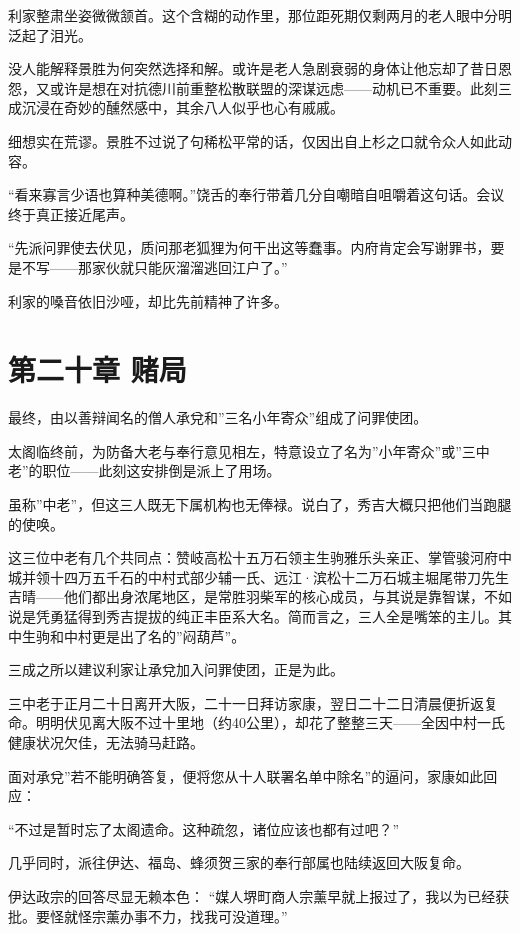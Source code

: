 \documentclass[
]{book}
\begin{document}
利家整肃坐姿微微颔首。这个含糊的动作里，那位距死期仅剩两月的老人眼中分明泛起了泪光。

没人能解释景胜为何突然选择和解。或许是老人急剧衰弱的身体让他忘却了昔日恩怨，又或许是想在对抗德川前重整松散联盟的深谋远虑------动机已不重要。此刻三成沉浸在奇妙的醺然感中，其余八人似乎也心有戚戚。

细想实在荒谬。景胜不过说了句稀松平常的话，仅因出自上杉之口就令众人如此动容。

``看来寡言少语也算种美德啊。''饶舌的奉行带着几分自嘲暗自咀嚼着这句话。会议终于真正接近尾声。

``先派问罪使去伏见，质问那老狐狸为何干出这等蠢事。内府肯定会写谢罪书，要是不写------那家伙就只能灰溜溜逃回江户了。''

利家的嗓音依旧沙哑，却比先前精神了许多。

\chapter*{第二十章 赌局}\label{ux7b2cux4e8cux5341ux7ae0-ux8d4cux5c40}

最终，由以善辩闻名的僧人承兌和''三名小年寄众''组成了问罪使团。

太阁临终前，为防备大老与奉行意见相左，特意设立了名为''小年寄众''或''三中老''的职位------此刻这安排倒是派上了用场。

虽称''中老''，但这三人既无下属机构也无俸禄。说白了，秀吉大概只把他们当跑腿的使唤。

这三位中老有几个共同点：赞岐高松十五万石领主生驹雅乐头亲正、掌管骏河府中城并领十四万五千石的中村式部少辅一氏、远江·滨松十二万石城主堀尾带刀先生吉晴------他们都出身浓尾地区，是常胜羽柴军的核心成员，与其说是靠智谋，不如说是凭勇猛得到秀吉提拔的纯正丰臣系大名。简而言之，三人全是嘴笨的主儿。其中生驹和中村更是出了名的''闷葫芦''。

三成之所以建议利家让承兌加入问罪使团，正是为此。

三中老于正月二十日离开大阪，二十一日拜访家康，翌日二十二日清晨便折返复命。明明伏见离大阪不过十里地（约40公里），却花了整整三天------全因中村一氏健康状况欠佳，无法骑马赶路。

面对承兌''若不能明确答复，便将您从十人联署名单中除名''的逼问，家康如此回应：

``不过是暂时忘了太阁遗命。这种疏忽，诸位应该也都有过吧？''

几乎同时，派往伊达、福岛、蜂须贺三家的奉行部属也陆续返回大阪复命。

伊达政宗的回答尽显无赖本色：
``媒人堺町商人宗薰早就上报过了，我以为已经获批。要怪就怪宗薰办事不力，找我可没道理。''
\end{document}
